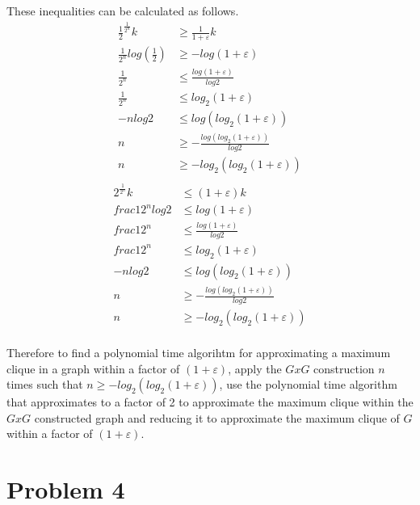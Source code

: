 \documentclass[11pt]{article}
\begin{document}
These inequalities can be calculated as follows.
\begin{align*}
\frac{1}{2}^{\frac{1}{2^n}}k &\geq \frac{1}{1+\varepsilon}k\\
\frac{1}{2^n}log(\frac{1}{2}) &\geq -log(1+\varepsilon)\\
\frac{1}{2^n} &\leq \frac{log(1+\varepsilon)}{log2}\\
\frac{1}{2^n} &\leq log_2(1+\varepsilon)\\
-nlog2 &\leq log(log_2(1+\varepsilon))\\
n &\geq - \frac{log(log_2(1+\varepsilon))}{log2}\\
n &\geq -log_2(log_2(1+\varepsilon))\\
\end{align*}
\begin{align*}
2^{\frac{1}{2^n}}k &\leq (1+\varepsilon)k\\
frac{1}{2^n}log2 &\leq log(1+\varepsilon)\\
frac{1}{2^n} &\leq \frac{log(1+\varepsilon)}{log2}\\
frac{1}{2^n} &\leq log_2(1+\varepsilon)\\
-nlog2 &\leq log(log_2(1+\varepsilon))\\
n &\geq -\frac{log(log_2(1+\varepsilon))}{log2}\\
n &\geq -log_2(log_2(1+\varepsilon))\\
\end{align*}

Therefore to find a polynomial time algorihtm for approximating a maximum clique in a graph within a factor of $(1+\varepsilon)$, apply the $GxG$ construction $n$ times such that $n \geq -log_2(log_2(1+\varepsilon))$, use the polynomial time algorithm that approximates to a factor of 2 to approximate the maximum clique within the $GxG$ constructed graph and reducing it to approximate the maximum clique of $G$ within a factor of $(1+\varepsilon)$.
\section*{Problem 4}
\end{document}
